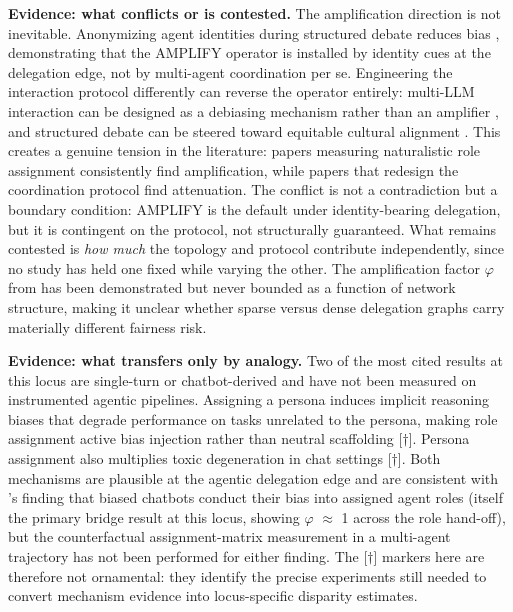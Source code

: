 \documentclass[10pt]{article}
\begin{document}
\textbf{Evidence: what conflicts or is contested.} The amplification direction is not inevitable. Anonymizing agent identities during structured debate reduces bias \cite{choi2025identity}, demonstrating that the AMPLIFY operator is installed by identity cues at the delegation edge, not by multi-agent coordination per se. Engineering the interaction protocol differently can reverse the operator entirely: multi-LLM interaction can be designed as a debiasing mechanism rather than an amplifier \cite{owens2024multi}, and structured debate can be steered toward equitable cultural alignment \cite{ki2025multiple}. This creates a genuine tension in the literature: papers measuring naturalistic role assignment consistently find amplification, while papers that redesign the coordination protocol find attenuation. The conflict is not a contradiction but a boundary condition: AMPLIFY is the default under identity-bearing delegation, but it is contingent on the protocol, not structurally guaranteed. What remains contested is \emph{how much} the topology and protocol contribute independently, since no study has held one fixed while varying the other. The amplification factor $\varphi$ from \cite{nguyen2025social} has been demonstrated but never bounded as a function of network structure, making it unclear whether sparse versus dense delegation graphs carry materially different fairness risk.

\textbf{Evidence: what transfers only by analogy.} Two of the most cited results at this locus are single-turn or chatbot-derived and have not been measured on instrumented agentic pipelines. Assigning a persona induces implicit reasoning biases that degrade performance on tasks unrelated to the persona, making role assignment active bias injection rather than neutral scaffolding \cite{gupta2023bias}[$\dagger$]. Persona assignment also multiplies toxic degeneration in chat settings \cite{deshpande2023toxicity}[$\dagger$]. Both mechanisms are plausible at the agentic delegation edge and are consistent with \cite{cao2026from}'s finding that biased chatbots conduct their bias into assigned agent roles (itself the primary bridge result at this locus, showing $\varphi$ $\approx$ 1 across the role hand-off), but the counterfactual assignment-matrix measurement in a multi-agent trajectory has not been performed for either finding. The [$\dagger$] markers here are therefore not ornamental: they identify the precise experiments still needed to convert mechanism evidence into locus-specific disparity estimates.
\end{document}
